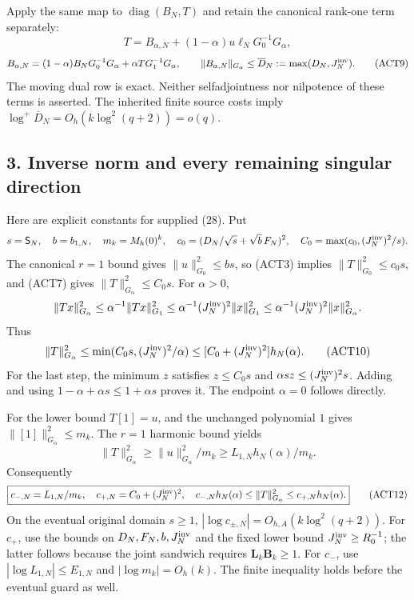 \documentclass[11pt]{article}
\begin{document}
Apply the same map to \(\operatorname{diag}(B_N,T)\) and retain the canonical rank-one term separately: \[
\boxed{T=B_{\alpha,N}+(1-\alpha)u\ell_NG_0^{-1}G_\alpha,}\tag{ACT8}
\] \[
B_{\alpha,N}=(1-\alpha)B_NG_0^{-1}G_\alpha+\alpha TG_1^{-1}G_\alpha,\qquad
\|B_{\alpha,N}\|_{G_\alpha}\le\overline D_N:=\max(D_N,J_N^{\rm inv}).
\tag{ACT9}
\] The moving dual row is exact. Neither selfadjointness nor nilpotence of these terms is asserted. The inherited finite source costs imply \(\log^+\overline D_N=O_h(k\log^2(q+2))=o(q)\).

\subsection{3. Inverse norm and every remaining singular direction}\label{inverse-norm-and-every-remaining-singular-direction}

Here are explicit constants for supplied (28). Put \[
s=\mathsf S_N,\quad b=b_{1,N},\quad m_k=M_h(0)^k,\quad
c_0=(D_N/\sqrt s+\sqrt b\,F_N)^2,\quad
C_0=\max(c_0,(J_N^{\rm inv})^2/s).
\] The canonical \(r=1\) bound gives \(\|u\|_{G_0}^2\le bs\), so (ACT3) implies \(\|T\|_{G_0}^2\le c_0s\), and (ACT7) gives \(\|T\|_{G_\alpha}^2\le C_0s\). For \(\alpha>0\), \[
\|Tx\|_{G_\alpha}^2\le\alpha^{-1}\|Tx\|_{G_1}^2
\le\alpha^{-1}(J_N^{\rm inv})^2\|x\|_{G_1}^2
\le\alpha^{-1}(J_N^{\rm inv})^2\|x\|_{G_\alpha}^2.
\] Thus \[
\|T\|_{G_\alpha}^2
\le\min(C_0s,(J_N^{\rm inv})^2/\alpha)
\le[C_0+(J_N^{\rm inv})^2]h_N(\alpha).
\tag{ACT10}
\] For the last step, the minimum \(z\) satisfies \(z\le C_0s\) and \(\alpha sz\le(J_N^{\rm inv})^2s\). Adding and using \(1-\alpha+\alpha s\le1+\alpha s\) proves it. The endpoint \(\alpha=0\) follows directly.

For the lower bound \(T[1]=u\), and the unchanged polynomial \(1\) gives \(\|[1]\|_{G_\alpha}^2\le m_k\). The \(r=1\) harmonic bound yields \[
\|T\|_{G_\alpha}^2\ge\|u\|_{G_\alpha}^2/m_k
\ge L_{1,N}h_N(\alpha)/m_k.
\tag{ACT11}
\] Consequently \[
\boxed{c_{-,N}=L_{1,N}/m_k,\quad c_{+,N}=C_0+(J_N^{\rm inv})^2,\quad
c_{-,N}h_N(\alpha)\le\|T\|_{G_\alpha}^2\le c_{+,N}h_N(\alpha).}
\tag{ACT12}
\] On the eventual original domain \(s\ge1\), \(|\log c_{\pm,N}|=O_{h,A}(k\log^2(q+2))\). For \(c_+\), use the bounds on \(D_N,F_N,b,J_N^{\rm inv}\) and the fixed lower bound \(J_N^{\rm inv}\ge R_0^{-1}\); the latter follows because the joint sandwich requires \(\mathbf L_k\mathbf B_k\ge1\). For \(c_-\), use \(|\log L_{1,N}|\le E_{1,N}\) and \(|\log m_k|=O_h(k)\). The finite inequality holds before the eventual guard as well.
\end{document}
